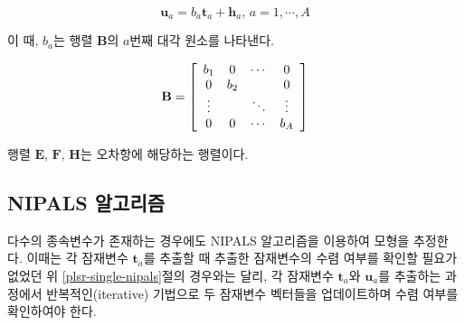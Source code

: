 \documentclass[]{book}
\begin{document}
\begin{equation*}
\mathbf{u}_a = b_a \mathbf{t}_a + \mathbf{h}_a, \, a = 1, \cdots, A
\end{equation*}

이 때, \(b_a\)는 행렬 \(\mathbf{B}\)의 \(a\)번째 대각 원소를 나타낸다.

\[\mathbf{B} = \left[ \begin{array}{c c c c}
b_{1} & 0 & \cdots & 0\\
0 & b_{2} &  & 0\\
\vdots &  & \ddots & \vdots \\
0 & 0 & \cdots & b_{A}
\end{array} \right]
\]

행렬 \(\mathbf{E}\), \(\mathbf{F}\), \(\mathbf{H}\)는 오차항에 해당하는 행렬이다.

\hypertarget{plsr-multivariate-nipals}{%
\subsection{NIPALS 알고리즘}\label{plsr-multivariate-nipals}}

다수의 종속변수가 존재하는 경우에도 NIPALS 알고리즘을 이용하여 모형을 추정한다. 이때는 각 잠재변수 \(\mathbf{t}_a\)를 추출할 때 추출한 잠재변수의 수렴 여부를 확인할 필요가 없었던 위 \ref{plsr-single-nipals}절의 경우와는 달리, 각 잠재변수 \(\mathbf{t}_a\)와 \(\mathbf{u}_a\)를 추출하는 과정에서 반복적인(iterative) 기법으로 두 잠재변수 벡터들을 업데이트하며 수렴 여부를 확인하여야 한다.
\end{document}
